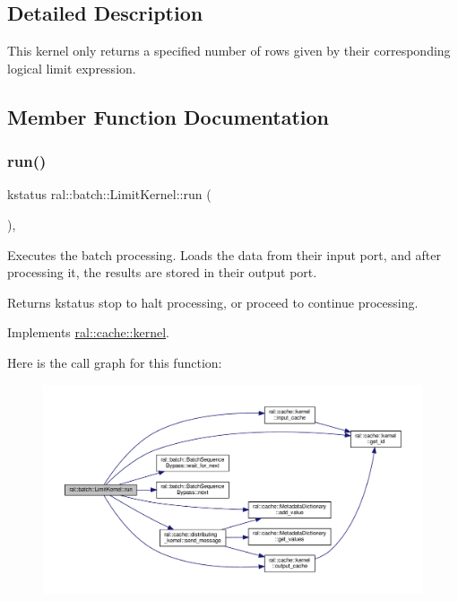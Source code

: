 \subsection{Detailed Description}
This kernel only returns a specified number of rows given by their corresponding logical limit expression. 

\subsection{Member Function Documentation}
\mbox{\label{classral_1_1batch_1_1LimitKernel_a154ab2ef98ef7be11d3ba6c8dc6db06d}} 
\subsubsection{\texorpdfstring{run()}{run()}}
{\footnotesize\ttfamily kstatus ral\+::batch\+::\+Limit\+Kernel\+::run (\begin{DoxyParamCaption}{ }\end{DoxyParamCaption})\hspace{0.3cm}{\ttfamily [override]}, {\ttfamily [virtual]}}



Executes the batch processing. Loads the data from their input port, and after processing it, the results are stored in their output port. 

\begin{DoxyReturn}{Returns}
kstatus \textquotesingle{}stop\textquotesingle{} to halt processing, or \textquotesingle{}proceed\textquotesingle{} to continue processing. 
\end{DoxyReturn}


Implements \hyperlink{classral_1_1cache_1_1kernel_a735b081cccae9574924e74ea6d293ef7}{ral\+::cache\+::kernel}.

Here is the call graph for this function\+:\nopagebreak
\begin{figure}[H]
\begin{center}
\leavevmode
\includegraphics[width=350pt]{classral_1_1batch_1_1LimitKernel_a154ab2ef98ef7be11d3ba6c8dc6db06d_cgraph}
\end{center}
\end{figure}


